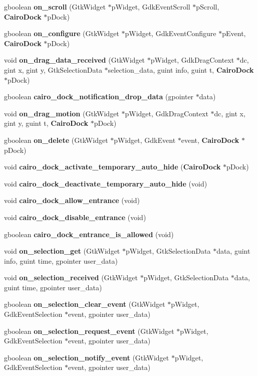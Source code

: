\begin{CompactItemize}
\item 
gboolean {\bf on\_\-scroll} (Gtk\-Widget $\ast$p\-Widget, Gdk\-Event\-Scroll $\ast$p\-Scroll, {\bf Cairo\-Dock} $\ast$p\-Dock)
\item 
gboolean {\bf on\_\-configure} (Gtk\-Widget $\ast$p\-Widget, Gdk\-Event\-Configure $\ast$p\-Event, {\bf Cairo\-Dock} $\ast$p\-Dock)
\item 
void {\bf on\_\-drag\_\-data\_\-received} (Gtk\-Widget $\ast$p\-Widget, Gdk\-Drag\-Context $\ast$dc, gint x, gint y, Gtk\-Selection\-Data $\ast$selection\_\-data, guint info, guint t, {\bf Cairo\-Dock} $\ast$p\-Dock)
\item 
gboolean {\bf cairo\_\-dock\_\-notification\_\-drop\_\-data} (gpointer $\ast$data)
\item 
void {\bf on\_\-drag\_\-motion} (Gtk\-Widget $\ast$p\-Widget, Gdk\-Drag\-Context $\ast$dc, gint x, gint y, guint t, {\bf Cairo\-Dock} $\ast$p\-Dock)
\item 
gboolean {\bf on\_\-delete} (Gtk\-Widget $\ast$p\-Widget, Gdk\-Event $\ast$event, {\bf Cairo\-Dock} $\ast$p\-Dock)
\item 
void {\bf cairo\_\-dock\_\-activate\_\-temporary\_\-auto\_\-hide} ({\bf Cairo\-Dock} $\ast$p\-Dock)
\item 
void {\bf cairo\_\-dock\_\-deactivate\_\-temporary\_\-auto\_\-hide} (void)
\item 
void {\bf cairo\_\-dock\_\-allow\_\-entrance} (void)
\item 
void {\bf cairo\_\-dock\_\-disable\_\-entrance} (void)
\item 
gboolean {\bf cairo\_\-dock\_\-entrance\_\-is\_\-allowed} (void)
\item 
void {\bf on\_\-selection\_\-get} (Gtk\-Widget $\ast$p\-Widget, Gtk\-Selection\-Data $\ast$data, guint info, guint time, gpointer user\_\-data)
\item 
void {\bf on\_\-selection\_\-received} (Gtk\-Widget $\ast$p\-Widget, Gtk\-Selection\-Data $\ast$data, guint time, gpointer user\_\-data)
\item 
gboolean {\bf on\_\-selection\_\-clear\_\-event} (Gtk\-Widget $\ast$p\-Widget, Gdk\-Event\-Selection $\ast$event, gpointer user\_\-data)
\item 
gboolean {\bf on\_\-selection\_\-request\_\-event} (Gtk\-Widget $\ast$p\-Widget, Gdk\-Event\-Selection $\ast$event, gpointer user\_\-data)
\item 
gboolean {\bf on\_\-selection\_\-notify\_\-event} (Gtk\-Widget $\ast$p\-Widget, Gdk\-Event\-Selection $\ast$event, gpointer user\_\-data)
\end{CompactItemize}
